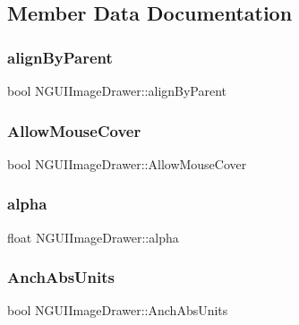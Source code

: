 \subsection{Member Data Documentation}
\hypertarget{class_n_g_u_i_image_drawer_a209fc87a8bd1153c26b14d0739e75900}{}\label{class_n_g_u_i_image_drawer_a209fc87a8bd1153c26b14d0739e75900} 
\subsubsection{\texorpdfstring{align\+By\+Parent}{alignByParent}}
{\footnotesize\ttfamily bool N\+G\+U\+I\+Image\+Drawer\+::align\+By\+Parent}

\hypertarget{class_n_g_u_i_image_drawer_a9c3f848a9c73894fa805b0617738085d}{}\label{class_n_g_u_i_image_drawer_a9c3f848a9c73894fa805b0617738085d} 
\subsubsection{\texorpdfstring{Allow\+Mouse\+Cover}{AllowMouseCover}}
{\footnotesize\ttfamily bool N\+G\+U\+I\+Image\+Drawer\+::\+Allow\+Mouse\+Cover}

\hypertarget{class_n_g_u_i_image_drawer_adebd64c9cdbcbec73abf154a01b6d5b6}{}\label{class_n_g_u_i_image_drawer_adebd64c9cdbcbec73abf154a01b6d5b6} 
\subsubsection{\texorpdfstring{alpha}{alpha}}
{\footnotesize\ttfamily float N\+G\+U\+I\+Image\+Drawer\+::alpha}

\hypertarget{class_n_g_u_i_image_drawer_aea633e92d6a01baf10814c6df5df44a7}{}\label{class_n_g_u_i_image_drawer_aea633e92d6a01baf10814c6df5df44a7} 
\subsubsection{\texorpdfstring{Anch\+Abs\+Units}{AnchAbsUnits}}
{\footnotesize\ttfamily bool N\+G\+U\+I\+Image\+Drawer\+::\+Anch\+Abs\+Units}

